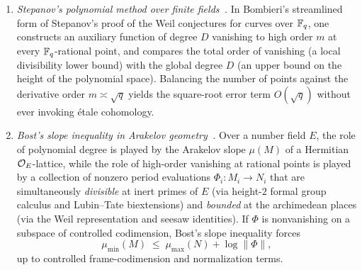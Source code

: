 \begin{enumerate}[label=(\roman*)]
\item \emph{Stepanov's polynomial method over finite fields~\cite{Stepanov1969}.} In Bombieri's streamlined form of Stepanov's proof of the Weil conjectures for curves over $\mathbb{F}_q$, one constructs an auxiliary function of degree $D$ vanishing to high order $m$ at every $\mathbb{F}_q$-rational point, and compares the total order of vanishing (a local divisibility lower bound) with the global degree $D$ (an upper bound on the height of the polynomial space). Balancing the number of points against the derivative order $m \asymp \sqrt{q}$ yields the square-root error term $O(\sqrt{q})$ without ever invoking \'etale cohomology.

\item \emph{Bost's slope inequality in Arakelov geometry~\cite{Bost1996}.} Over a number field $E$, the role of polynomial degree is played by the Arakelov slope $\mu(M)$ of a Hermitian $\mathcal{O}_E$-lattice, while the role of high-order vanishing at rational points is played by a collection of nonzero period evaluations $\Phi_i : M_i \to N_i$ that are simultaneously \emph{divisible} at inert primes of $E$ (via height-$2$ formal group calculus and Lubin--Tate biextensions) and \emph{bounded} at the archimedean places (via the Weil representation and seesaw identities). If $\Phi$ is nonvanishing on a subspace of controlled codimension, Bost's slope inequality forces
\[
  \mu_{\min}(M) \;\le\; \mu_{\max}(N) + \log \|\Phi\|,
\]
up to controlled frame-codimension and normalization terms.
\end{enumerate}

